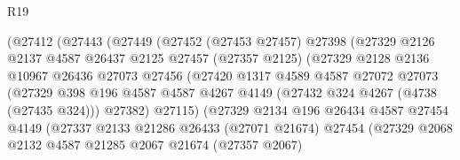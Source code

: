 \begin{lexlean}{R19}
\begin{coremodule}
                        (@27412
                          (@27443
                            (@27449
                              (@27452
                                (@27453 @27457)
                                @27398
                                (@27329
                                  @2126
                                  @2137
                                  @4587
                                  @26437
                                  @2125
                                  @27457
                                  (@27357 @2125)
                                  (@27329
                                    @2128
                                    @2136
                                    @10967
                                    @26436
                                    @27073
                                    @27456
                                    (@27420
                                      @1317
                                      @4589
                                      @4587
                                      @27072
                                      @27073
                                      (@27329
                                        @398
                                        @196
                                        @4587
                                        @4587
                                        @4267
                                        @4149
                                        (@27432 @324 @4267 (@4738 (@27435 @324)))
                                        @27382)
                                      @27115)
                                    (@27329
                                      @2134
                                      @196
                                      @26434
                                      @4587
                                      @27454
                                      @4149
                                      (@27337
                                        @2133
                                        @21286
                                        @26433
                                        (@27071 @21674)
                                        @27454
                                        (@27329
                                          @2068
                                          @2132
                                          @4587
                                          @21285
                                          @2067
                                          @21674
                                          (@27357 @2067)

\end{coremodule}
\end{lexlean}
